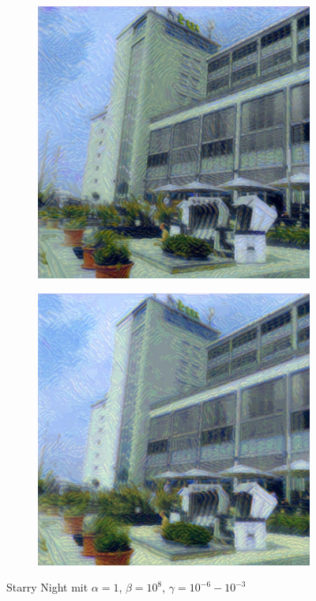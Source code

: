 \begin{figure}[H]
\begin{subfigure}[h]{0.24\textwidth}
    \end{subfigure}
    \begin{subfigure}[h]{0.24\textwidth}
        \centering
        \includegraphics[width=\textwidth]{resources/content/experiments/b__the_starry_night__768x768__style-weight_1e+08__tv-weight_1e-04.jpg}
    \end{subfigure}
    \begin{subfigure}[h]{0.24\textwidth}
        \centering
        \includegraphics[width=\textwidth]{resources/content/experiments/b__the_starry_night__768x768__style-weight_1e+08__tv-weight_1e-03.jpg}
    \end{subfigure}
    \caption{Starry Night mit $ \alpha = 1 $, $ \beta = 10^{8} $, $ \gamma = 10^{-6} - 10^{-3} $}
\end{figure}

